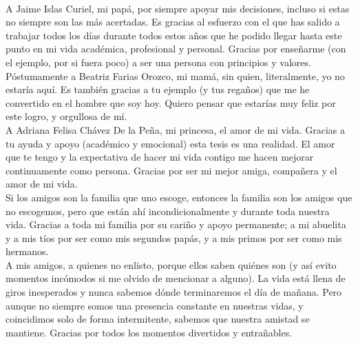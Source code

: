 \documentclass[
12pt, %
spanish, %
onehalfspacing, %
headsepline, %
]{MastersDoctoralThesis} %
\begin{document}

\begin{acknowledgements}
\addchaptertocentry{\acknowledgementname} %
\\
A Jaime Islas Curiel, mi papá, por siempre apoyar mis decisiones, incluso si estas no siempre son las más acertadas. Es gracias al esfuerzo con el que has salido a trabajar todos los días durante todos estos años que he podido llegar hasta este punto en mi vida académica, profesional y personal. Gracias por enseñarme (con el ejemplo, por si fuera poco) a ser una persona con principios y valores.\\

Póstumamente a Beatriz Farias Orozco, mi mamá, sin quien, literalmente, yo no estaría aquí. Es también gracias a tu ejemplo (y tus regaños) que me he convertido en el hombre que soy hoy. Quiero pensar que estarías muy feliz por este logro, y orgullosa de mí.\\

A Adriana Felisa Chávez De la Peña, mi princesa, el amor de mi vida. Gracias a tu ayuda y apoyo (académico y emocional) esta tesis es una realidad. El amor que te tengo y la expectativa de hacer mi vida contigo me hacen mejorar continuamente como persona. Gracias por ser mi mejor amiga, compañera y el amor de mi vida.\\

Si los amigos son la familia que uno escoge, entonces la familia son los amigos que no escogemos, pero que están ahí incondicionalmente y durante toda nuestra vida. Gracias a toda mi familia por su cariño y apoyo permanente; a mi abuelita y a mis tíos por ser como mis segundos papás, y a mis primos por ser como mis hermanos.\\

A mis amigos, a quienes no enlisto, porque ellos saben quiénes son (y así evito momentos incómodos si me olvido de mencionar a alguno). La vida está llena de giros inesperados y nunca sabemos dónde terminaremos el día de mañana. Pero aunque no siempre somos una presencia constante en nuestras vidas, y coincidimos solo de forma intermitente, sabemos que nuestra amistad se mantiene. Gracias por todos los momentos divertidos y entrañables.\\

\clearpage


\end{acknowledgements}
\end{document}
